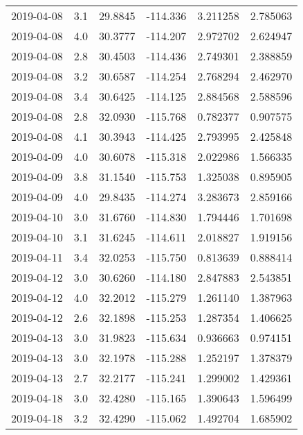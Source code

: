 \begin{tabular}{lrrrrr}
2019-04-08 &       3.1 &  29.8845 &  -114.336 &         3.211258 &         2.785063 \\
2019-04-08 &       4.0 &  30.3777 &  -114.207 &         2.972702 &         2.624947 \\
2019-04-08 &       2.8 &  30.4503 &  -114.436 &         2.749301 &         2.388859 \\
2019-04-08 &       3.2 &  30.6587 &  -114.254 &         2.768294 &         2.462970 \\
2019-04-08 &       3.4 &  30.6425 &  -114.125 &         2.884568 &         2.588596 \\
2019-04-08 &       2.8 &  32.0930 &  -115.768 &         0.782377 &         0.907575 \\
2019-04-08 &       4.1 &  30.3943 &  -114.425 &         2.793995 &         2.425848 \\
2019-04-09 &       4.0 &  30.6078 &  -115.318 &         2.022986 &         1.566335 \\
2019-04-09 &       3.8 &  31.1540 &  -115.753 &         1.325038 &         0.895905 \\
2019-04-09 &       4.0 &  29.8435 &  -114.274 &         3.283673 &         2.859166 \\
2019-04-10 &       3.0 &  31.6760 &  -114.830 &         1.794446 &         1.701698 \\
2019-04-10 &       3.1 &  31.6245 &  -114.611 &         2.018827 &         1.919156 \\
2019-04-11 &       3.4 &  32.0253 &  -115.750 &         0.813639 &         0.888414 \\
2019-04-12 &       3.0 &  30.6260 &  -114.180 &         2.847883 &         2.543851 \\
2019-04-12 &       4.0 &  32.2012 &  -115.279 &         1.261140 &         1.387963 \\
2019-04-12 &       2.6 &  32.1898 &  -115.253 &         1.287354 &         1.406625 \\
2019-04-13 &       3.0 &  31.9823 &  -115.634 &         0.936663 &         0.974151 \\
2019-04-13 &       3.0 &  32.1978 &  -115.288 &         1.252197 &         1.378379 \\
2019-04-13 &       2.7 &  32.2177 &  -115.241 &         1.299002 &         1.429361 \\
2019-04-18 &       3.0 &  32.4280 &  -115.165 &         1.390643 &         1.596499 \\
2019-04-18 &       3.2 &  32.4290 &  -115.062 &         1.492704 &         1.685902 \\

\end{tabular}
